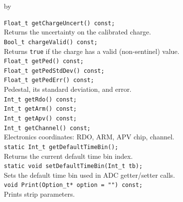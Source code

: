 \documentclass[twoside]{article}
\newcommand{\entrylabel}[1]{\mbox{\textbf{{#1}}}\hfil}%
\newenvironment{entry}
{\begin{list}{}%
    {\renewcommand{\makelabel}{\entrylabel}%
     \setlength{\labelwidth}{90pt}%
     \setlength{\leftmargin}{\labelwidth}
     \advance\leftmargin by \labelsep%
      }%
    }%
  {\end{list}}
\newcommand{\Entrylabel}[1]%
{\raisebox{0pt}[1ex][0pt]{\makebox[\labelwidth][l]%
    {\parbox[t]{\labelwidth}{\hspace{0pt}\textbf{{#1}}}}}}
\newenvironment{Entry}%
{\renewcommand{\entrylabel}{\Entrylabel}\begin{entry}}%
  {\end{entry}}
\begin{document}
\begin{Entry}
    \verb+Float_t getChargeUncert() const;+\\
    Returns the uncertainty on the calibrated charge.\\
    \verb+Bool_t chargeValid() const;+\\
    Returns \texttt{true} if the charge has a valid (non-sentinel) value.\\
    \verb+Float_t getPed() const;+\\
    \verb+Float_t getPedStdDev() const;+\\
    \verb+Float_t getPedErr() const;+\\
    Pedestal, its standard deviation, and error.\\
    \verb+Int_t getRdo() const;+\\
    \verb+Int_t getArm() const;+\\
    \verb+Int_t getApv() const;+\\
    \verb+Int_t getChannel() const;+\\
    Electronics coordinates: RDO, ARM, APV chip, channel.\\
    \verb+static Int_t getDefaultTimeBin();+\\
    Returns the current default time bin index.\\
    \verb+static void setDefaultTimeBin(Int_t tb);+\\
    Sets the default time bin used in ADC getter/setter calls.\\
    \verb+void Print(Option_t* option = "") const;+\\
    Prints strip parameters.\\
\end{Entry}
\clearpage

\end{document}
